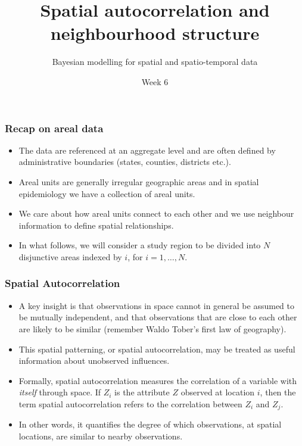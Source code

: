 \documentclass[12pt]{beamer}
\title{Spatial autocorrelation and neighbourhood structure}
\subtitle{}
\author{Bayesian modelling for spatial and spatio-temporal data}
\institute{MSc in Epidemiology}
\date{Week 6}
\begin{document}
\begin{frame}[t]
  \titlepage
\end{frame}

\begin{frame}
\frametitle{Recap on areal data}
\begin{itemize} \setlength\itemsep{\fill}
\item  The data are referenced at an aggregate level and are often defined by administrative boundaries (states, counties, districts etc.).
\item  Areal units are generally irregular geographic areas and in spatial epidemiology we have a collection of areal units.
\item  We care about how areal units connect to each other and we use neighbour information to define spatial relationships.
\item  In what follows, we will consider a study region to be divided into $N$ disjunctive areas indexed by $i$, for $i=1,\dots,N$.
\end{itemize}
\end{frame}


\begin{frame}
\frametitle{Spatial Autocorrelation}
\begin{itemize} \setlength\itemsep{\fill}
\item A key insight is that observations in space cannot in general be assumed to be mutually independent, and that observations that are close to each other are likely to be similar (remember Waldo Tober's first law of geography).
\item  This spatial patterning, or \alert{spatial autocorrelation}, may be treated as useful information about unobserved influences.
\item  Formally, spatial autocorrelation measures the correlation of a variable with \emph{itself} through space. If $Z_i$ is the attribute $Z$ observed at location $i$, then the term spatial autocorrelation refers to the correlation between $Z_i$ and $Z_j$.
\item In other words, it quantifies the degree of which observations, at spatial locations, are similar to nearby observations.
  \end{itemize}
\end{frame}

\end{document}
